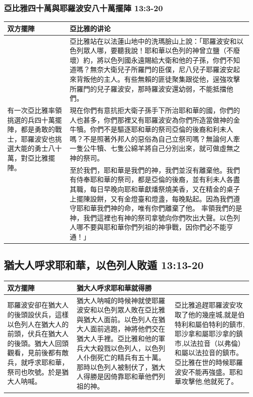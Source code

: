\subsubsection{亞比雅四十萬與耶羅波安八十萬擺陣 13:3-20}
\begin{table}[H]
\centering 
\begin{tabular}{p{1.75cm}|p{15.5cm}}\hline\hline
双方擺陣&亞比雅的讲论\\\hline\hline
\multirow{3}{1.9cm}{有一次亞比雅率領挑選的兵四十萬擺陣，都是勇敢的戰士，耶羅波安也挑選大能的勇士八十萬，對亞比雅擺陣。}
&亞比雅站在以法蓮山地中的洗瑪臉山上說：「耶羅波安和以色列眾人哪，要聽我說！耶和華以色列的神曾立鹽（不廢壞）約，將以色列國永遠賜給大衛和他的子孫，你們不知道嗎？無奈大衛兒子所羅門的臣僕，尼八兒子耶羅波安起來背叛他的主人。有些無賴的匪徒聚集跟從他，逞強攻擊所羅門的兒子羅波安，那時羅波安還幼弱，不能抵擋他們。\\\cline{2-2}
&現在你們有意抗拒大衛子孫手下所治耶和華的國，你們的人也甚多，你們那裡又有耶羅波安為你們所造當做神的金牛犢。你們不是驅逐耶和華的祭司亞倫的後裔和利未人嗎？不是照著外邦人的惡俗為自己立祭司嗎？無論何人牽一隻公牛犢、七隻公綿羊將自己分別出來，就可做虛無之神的祭司。\\\cline{2-2}
&至於我們，耶和華是我們的神，我們並沒有離棄他。我們有侍奉耶和華的祭司，都是亞倫的後裔，並有利未人各盡其職，每日早晚向耶和華獻燔祭燒美香，又在精金的桌子上擺陳設餅，又有金燈臺和燈盞，每晚點起。因為我們遵守耶和華我們神的命，唯有你們離棄了他。 率領我們的是神，我們這裡也有神的祭司拿號向你們吹出大聲。以色列人哪不要與耶和華你們列祖的神爭戰，因你們必不能亨通！」\\\hline
\end{tabular}
\end{table}
 

\subsection{猶大人呼求耶和華，以色列人敗遁 13:13-20}
\begin{table}[H]
\centering 
\begin{tabular}{p{4.65cm}|p{7.15cm}|p{5.5cm}}\hline\hline
双方擺陣&猶大人呼求耶和華就得勝&\\\hline\hline
耶羅波安卻在猶大人的後頭設伏兵，這樣以色列人在猶大人的前頭，伏兵在猶大人的後頭。猶大人回頭觀看，見前後都有敵兵，就呼求耶和華，祭司也吹號。於是猶大人呐喊。
&猶大人呐喊的時候神就使耶羅波安和以色列眾人敗在亞比雅與猶大人面前。以色列人在猶大人面前逃跑，神將他們交在猶大人手裡。亞比雅和他的軍兵大大殺戮以色列人，以色列人仆倒死亡的精兵有五十萬。那時以色列人被制伏了，猶大人得勝是因倚靠耶和華他們列祖的神。
&亞比雅追趕耶羅波安攻取了他的幾座城,就是伯特利和屬伯特利的鎮市,耶沙拿和屬耶沙拿的鎮市,以法拉音（以弗倫）和屬以法拉音的鎮市。亞比雅在世的時候耶羅波安不能再強盛。耶和華攻擊他,他就死了。 
\\\hline
\end{tabular}
\end{table}



